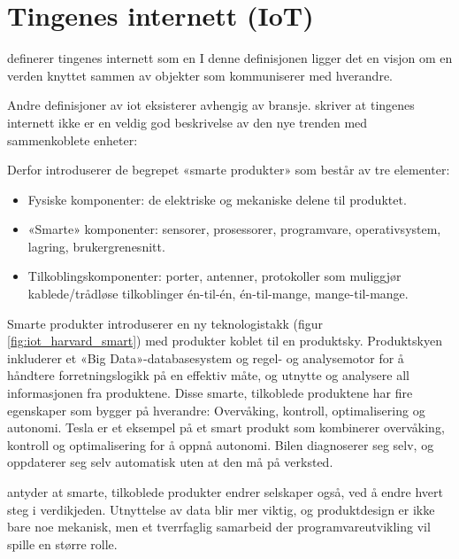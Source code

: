 
\section{Tingenes internett (IoT)}
\citet{iot_legal} definerer tingenes internett som en
 I denne definisjonen ligger det en
visjon om en verden knyttet sammen av objekter som kommuniserer med hverandre.

Andre definisjoner av \gls{iot} eksisterer avhengig av bransje. \citet{iot_harvard_smart} skriver
at tingenes internett ikke er en veldig god beskrivelse av den nye trenden med
sammenkoblete enheter: 

Derfor introduserer de begrepet «smarte produkter» som består av tre elementer:

 \begin{itemize}
    \item Fysiske komponenter: de elektriske og mekaniske delene til produktet.
    \item «Smarte» komponenter: sensorer, prosessorer, programvare, operativsystem, lagring, brukergrenesnitt.
    \item Tilkoblingskomponenter: porter, antenner, protokoller som muliggjør kablede/trådløse tilkoblinger
    én-til-én, én-til-mange, mange-til-mange.
\end{itemize}

Smarte produkter introduserer en ny teknologistakk (figur \ref{fig:iot_harvard_smart}) med produkter koblet til
en produktsky. Produktskyen inkluderer et «Big Data»-databasesystem og regel- og analysemotor for å håndtere
forretningslogikk på en effektiv måte, og utnytte og analysere all informasjonen fra produktene.
Disse smarte, tilkoblede produktene har fire egenskaper som bygger på hverandre: Overvåking, kontroll,
optimalisering og autonomi. Tesla er et eksempel på et smart produkt som kombinerer overvåking, kontroll og
optimalisering for å oppnå autonomi. Bilen diagnoserer seg selv, og oppdaterer seg selv automatisk uten
at den må på verksted.

\citet{iot_harvard_smartcompanies} antyder at smarte, tilkoblede produkter endrer selskaper også, ved
å endre hvert steg i verdikjeden. Utnyttelse av data blir mer viktig, og produktdesign er ikke bare noe
mekanisk, men et tverrfaglig samarbeid der programvareutvikling vil spille en større rolle. 

